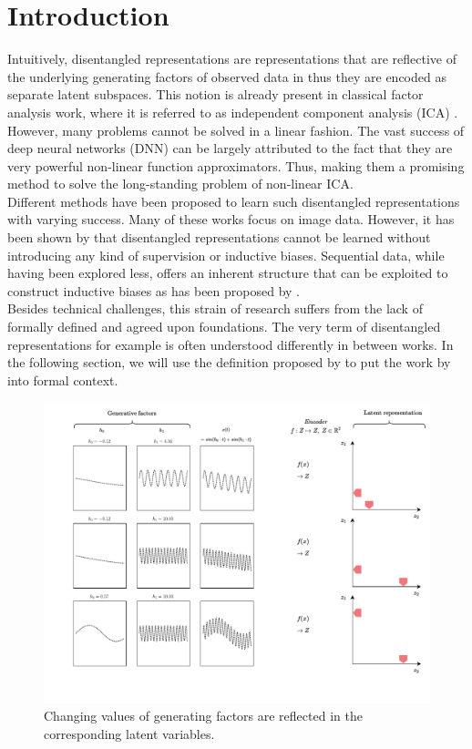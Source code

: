 \documentclass{article} %
\begin{document}
\section*{Introduction}
Intuitively, disentangled representations are representations that are reflective of the underlying generating factors of observed data in thus they are encoded as separate latent subspaces. This notion is already present in classical factor analysis work, where it is referred to as independent component analysis (ICA) \cite{comon1992independent}.\\
However, many problems cannot be solved in a linear fashion. The vast success of deep neural networks (DNN) can be largely attributed to the fact that they are very powerful non-linear function approximators. Thus, making them a promising method to solve the long-standing problem of non-linear ICA.\\
Different methods have been proposed to learn such disentangled representations \cite{higgins2016beta, chen2016infogan, kulkarni2015deep} with varying success. Many of these works focus on image data. However, it has been shown by \citet{locatello2019challenging} that disentangled representations cannot be learned without introducing any kind of supervision or inductive biases. Sequential data, while having been explored less, offers an inherent structure that can be exploited to construct inductive biases as has been proposed by \citet{hsu2017unsupervised}.\\
Besides technical challenges, this strain of research suffers from the lack of formally defined and agreed upon foundations. The very term of disentangled representations for example is often understood differently in between works. In the following section, we will use the definition proposed by \citet{higgins2018towards} to put the work by \citet{hsu2017unsupervised} into formal context.

\begin{figure}
	\centering
	\includegraphics[width=.9\linewidth]{../figures/intution_3x3_static.pdf}
	\caption{Changing values of generating factors are reflected in the corresponding latent variables.}
\end{figure}
\end{document}
